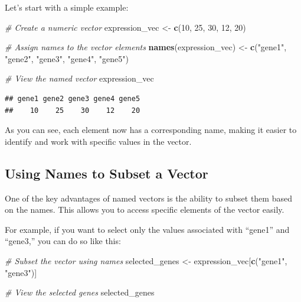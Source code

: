 \documentclass[
]{book}
\newenvironment{Shaded}{\begin{snugshade}}{\end{snugshade}}
\newcommand{\CommentTok}[1]{\textcolor[rgb]{0.56,0.35,0.01}{\textit{#1}}}
\newcommand{\DecValTok}[1]{\textcolor[rgb]{0.00,0.00,0.81}{#1}}
\newcommand{\FunctionTok}[1]{\textcolor[rgb]{0.13,0.29,0.53}{\textbf{#1}}}
\newcommand{\NormalTok}[1]{#1}
\newcommand{\OtherTok}[1]{\textcolor[rgb]{0.56,0.35,0.01}{#1}}
\newcommand{\StringTok}[1]{\textcolor[rgb]{0.31,0.60,0.02}{#1}}
\begin{document}
Let's start with a simple example:

\begin{Shaded}
\begin{Highlighting}[]
\CommentTok{\# Create a numeric vector}
\NormalTok{expression\_vec }\OtherTok{\textless{}{-}} \FunctionTok{c}\NormalTok{(}\DecValTok{10}\NormalTok{, }\DecValTok{25}\NormalTok{, }\DecValTok{30}\NormalTok{, }\DecValTok{12}\NormalTok{, }\DecValTok{20}\NormalTok{)}

\CommentTok{\# Assign names to the vector elements}
\FunctionTok{names}\NormalTok{(expression\_vec) }\OtherTok{\textless{}{-}} \FunctionTok{c}\NormalTok{(}\StringTok{"gene1"}\NormalTok{, }\StringTok{"gene2"}\NormalTok{, }\StringTok{"gene3"}\NormalTok{, }\StringTok{"gene4"}\NormalTok{, }\StringTok{"gene5"}\NormalTok{)}

\CommentTok{\# View the named vector}
\NormalTok{expression\_vec}
\end{Highlighting}
\end{Shaded}

\begin{verbatim}
## gene1 gene2 gene3 gene4 gene5 
##    10    25    30    12    20
\end{verbatim}

As you can see, each element now has a corresponding name, making it easier to identify and work with specific values in the vector.

\hypertarget{using-names-to-subset-a-vector}{%
\subsection{Using Names to Subset a Vector}\label{using-names-to-subset-a-vector}}

One of the key advantages of named vectors is the ability to subset them based on the names. This allows you to access specific elements of the vector easily.

For example, if you want to select only the values associated with ``gene1'' and ``gene3,'' you can do so like this:

\begin{Shaded}
\begin{Highlighting}[]
\CommentTok{\# Subset the vector using names}
\NormalTok{selected\_genes }\OtherTok{\textless{}{-}}\NormalTok{ expression\_vec[}\FunctionTok{c}\NormalTok{(}\StringTok{"gene1"}\NormalTok{, }\StringTok{"gene3"}\NormalTok{)]}

\CommentTok{\# View the selected genes}
\NormalTok{selected\_genes}
\end{Highlighting}
\end{Shaded}
\end{document}
